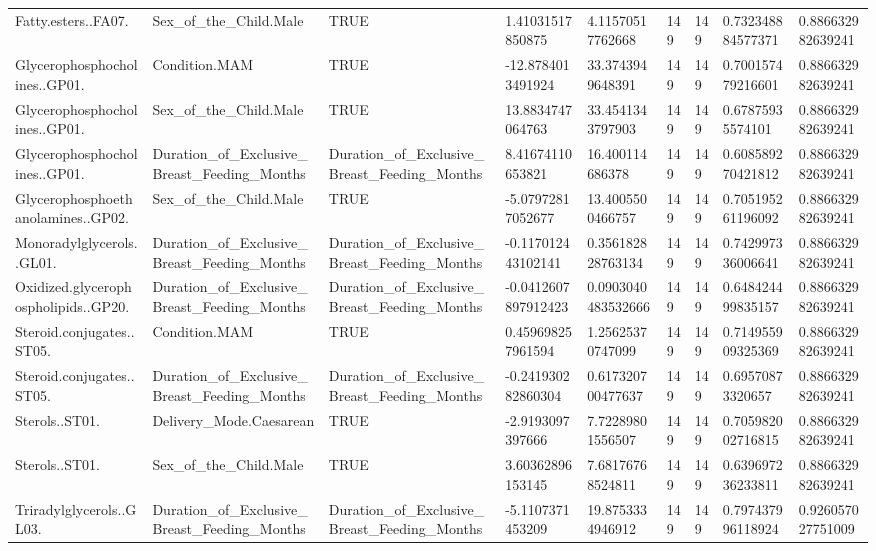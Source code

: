 \begin{longtable}{lllllllll}
Fatty.esters..FA07. & Sex\_of\_the\_Child.Male & TRUE & 1.41031517850875 & 4.11570517762668 & 149 & 149 & 0.732348884577371 & 0.886632982639241 \\
Glycerophosphocholines..GP01. & Condition.MAM & TRUE & -12.8784013491924 & 33.3743949648391 & 149 & 149 & 0.700157479216601 & 0.886632982639241 \\
Glycerophosphocholines..GP01. & Sex\_of\_the\_Child.Male & TRUE & 13.8834747064763 & 33.4541343797903 & 149 & 149 & 0.67875935574101 & 0.886632982639241 \\
Glycerophosphocholines..GP01. & Duration\_of\_Exclusive\_Breast\_Feeding\_Months & Duration\_of\_Exclusive\_Breast\_Feeding\_Months & 8.41674110653821 & 16.400114686378 & 149 & 149 & 0.608589270421812 & 0.886632982639241 \\
Glycerophosphoethanolamines..GP02. & Sex\_of\_the\_Child.Male & TRUE & -5.07972817052677 & 13.4005500466757 & 149 & 149 & 0.705195261196092 & 0.886632982639241 \\
Monoradylglycerols..GL01. & Duration\_of\_Exclusive\_Breast\_Feeding\_Months & Duration\_of\_Exclusive\_Breast\_Feeding\_Months & -0.117012443102141 & 0.356182828763134 & 149 & 149 & 0.742997336006641 & 0.886632982639241 \\
Oxidized.glycerophospholipids..GP20. & Duration\_of\_Exclusive\_Breast\_Feeding\_Months & Duration\_of\_Exclusive\_Breast\_Feeding\_Months & -0.0412607897912423 & 0.0903040483532666 & 149 & 149 & 0.648424499835157 & 0.886632982639241 \\
Steroid.conjugates..ST05. & Condition.MAM & TRUE & 0.459698257961594 & 1.25625370747099 & 149 & 149 & 0.714955909325369 & 0.886632982639241 \\
Steroid.conjugates..ST05. & Duration\_of\_Exclusive\_Breast\_Feeding\_Months & Duration\_of\_Exclusive\_Breast\_Feeding\_Months & -0.241930282860304 & 0.617320700477637 & 149 & 149 & 0.69570873320657 & 0.886632982639241 \\
Sterols..ST01. & Delivery\_Mode.Caesarean & TRUE & -2.9193097397666 & 7.72289801556507 & 149 & 149 & 0.705982002716815 & 0.886632982639241 \\
Sterols..ST01. & Sex\_of\_the\_Child.Male & TRUE & 3.60362896153145 & 7.68176768524811 & 149 & 149 & 0.639697236233811 & 0.886632982639241 \\
Triradylglycerols..GL03. & Duration\_of\_Exclusive\_Breast\_Feeding\_Months & Duration\_of\_Exclusive\_Breast\_Feeding\_Months & -5.1107371453209 & 19.8753334946912 & 149 & 149 & 0.797437996118924 & 0.926057027751009 \\

\end{longtable}
